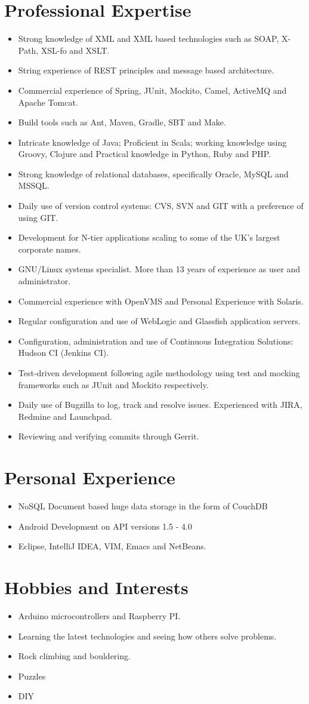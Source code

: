 \documentclass[a4paper,10pt]{moderncv}
\begin{document}
\section{Professional Expertise}
\begin{itemize}
\item Strong knowledge of XML and XML based technologies such as SOAP, X-Path, XSL-fo and XSLT.
\item String experience of REST principles and message based architecture.
\item Commercial experience of Spring, JUnit, Mockito, Camel, ActiveMQ and Apache Tomcat.
\item Build tools such as Ant, Maven, Gradle, SBT and Make.
\item Intricate knowledge of Java; Proficient in Scala; working knowledge using Groovy, Clojure and Practical knowledge in Python, Ruby and PHP.
\item Strong knowledge of relational databases, specifically Oracle, MySQL and MSSQL.
\item Daily use of version control systems: CVS, SVN and GIT with a preference of using GIT.
\item Development for N-tier applications scaling to some of the UK's largest corporate names.
\item GNU/Linux systems specialist. More than 13 years of experience as user
  and administrator.
\item Commercial experience with OpenVMS and Personal Experience with Solaris.
\item Regular configuration and use of WebLogic and Glassfish application servers.
\item Configuration, administration and use of Continuous Integration
Solutions: Hudson CI (Jenkins CI).
\item Test-driven development following agile methodology using test and mocking frameworks such as JUnit and Mockito respectively.
\item Daily use of Bugzilla to log, track and resolve issues. Experienced with JIRA, Redmine and Launchpad.
\item Reviewing and verifying commits through Gerrit.
\end{itemize}

\section{Personal Experience}
\begin{itemize}
\item NoSQL Document based huge data storage in the form of CouchDB
\item Android Development on API versions 1.5 - 4.0
\item Eclipse, IntelliJ IDEA, VIM, Emacs and NetBeans.
\end{itemize}

\section{Hobbies and Interests}
\begin{itemize}
\item Arduino microcontrollers and Raspberry PI.
\item Learning the latest technologies and seeing how others solve problems.
\item Rock climbing and bouldering.
\item Puzzles
\item DIY
\end{itemize}
\end{document}
